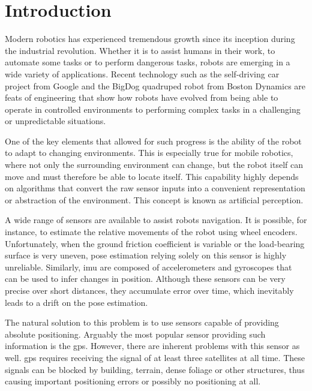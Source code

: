 \chapter*{Introduction} 

Modern robotics has experienced tremendous growth since its inception during the industrial revolution. Whether it is to assist humans in their work, to automate some tasks or to perform dangerous tasks, robots are emerging in a wide variety of applications. Recent technology such as the self-driving car project from Google and the BigDog quadruped robot from Boston Dynamics are feats of engineering that show how robots have evolved from being able to operate in controlled environments to performing complex tasks in a challenging or unpredictable situations.

One of the key elements that allowed for such progress is the ability of the robot to adapt to changing environments. This is especially true for mobile robotics, where not only the surrounding environment can change, but the robot itself can move and must therefore be able to locate itself. This capability highly depends on algorithms that convert the raw sensor inputs into a convenient representation or abstraction of the environment. This concept is known as artificial perception.

A wide range of sensors are available to assist robots navigation. It is possible, for instance, to estimate the relative movements of the robot using wheel encoders. Unfortunately, when the ground friction coefficient is variable or the load-bearing surface is very uneven, pose estimation relying solely on this sensor is highly unreliable. Similarly, \gls*{imu} are composed of accelerometers and gyroscopes that can be used to infer changes in position. Although these sensors can be very precise over short distances, they accumulate error over time, which inevitably leads to a drift on the pose estimation.

The natural solution to this problem is to use sensors capable of providing absolute positioning. Arguably the most popular sensor providing such information is the \gls*{gps}. However, there are inherent problems with this sensor as well. \gls*{gps} requires receiving the signal of at least three satellites at all time. These signals can be blocked by building, terrain, dense foliage or other structures, thus causing important positioning errors or possibly no positioning at all.


